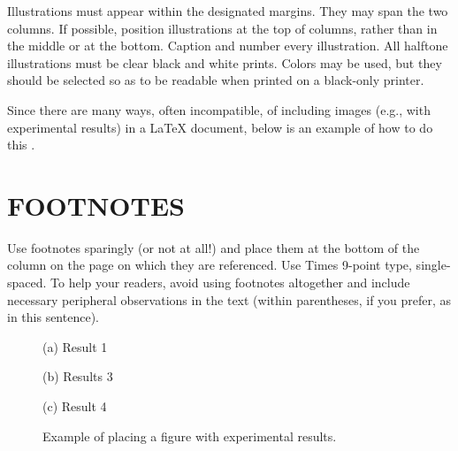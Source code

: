 \documentclass[letterpaper, 11 pt, twoside, conference]{ieeeconf}
\begin{document}
Illustrations must appear within the designated margins.  They may span the two
columns.  If possible, position illustrations at the top of columns, rather
than in the middle or at the bottom.  Caption and number every illustration.
All halftone illustrations must be clear black and white prints.  Colors may be
used, but they should be selected so as to be readable when printed on a
black-only printer.

Since there are many ways, often incompatible, of including images (e.g., with
experimental results) in a LaTeX document, below is an example of how to do
this \cite{Chai1999}.

\section{FOOTNOTES}
\label{sec:foot}

Use footnotes sparingly (or not at all!) and place them at the bottom of the
column on the page on which they are referenced. Use Times 9-point type,
single-spaced. To help your readers, avoid using footnotes altogether and
include necessary peripheral observations in the text (within parentheses, if
you prefer, as in this sentence).

\begin{figure}[htb]

\begin{minipage}[b]{1.0\linewidth}
  \centering
  \centerline{(a) Result 1}\medskip
\end{minipage}
%
\begin{minipage}[b]{.48\linewidth}
  \centering
  \centerline{(b) Results 3}\medskip
\end{minipage}
\hfill
\begin{minipage}[b]{0.48\linewidth}
  \centering
  \centerline{(c) Result 4}\medskip
\end{minipage}
%
\caption{Example of placing a figure with experimental results.}
\label{fig:res}
%
\end{figure}
\end{document}
